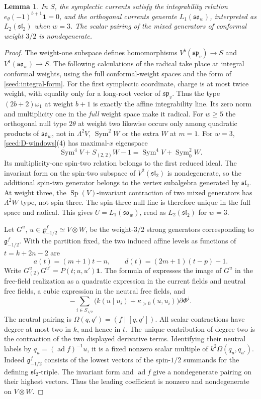 \documentclass[11pt,a4paper]{amsart}
\numberwithin{equation}{section}
\newtheorem{lemma}[theorem]{Lemma}
\theoremstyle{definition}
\theoremstyle{remark}
\newcommand{\g}{\mathfrak g}
\newcommand{\spg}{\mathfrak{sp}}
\newcommand{\sog}{\mathfrak{so}}
\newcommand{\slg}{\mathfrak{sl}}
\newcommand{\Sym}{\operatorname{Sym}}
\begin{document}
\begin{lemma}\label{seed:D-current-pairing}
In $S$, the symplectic currents satisfy the integrability relation
$e_\theta(-1)^{b+1}\mathbf1=0$, and the orthogonal currents generate
$L_1(\sog_w)$, interpreted as $L_2(\slg_2)$ when $w=3$.
The scalar pairing of the mixed generators of conformal weight $3/2$
is nondegenerate.
\end{lemma}
\begin{proof}
The weight-one subspace defines homomorphisms
$V^b(\spg_v)\to S$ and $V^1(\sog_w)\to S$.
The following calculations of the radical take place at integral conformal weights,
using the full conformal-weight spaces and the form of \cref{seed:integral-form}.
For the first symplectic coordinate, charge is at most twice weight,
with equality only for a long-root vector of $\spg_v$. Thus the type
$(2b+2)\omega_1$ at weight $b+1$ is exactly the affine integrability
line. Its zero norm and multiplicity one in the \emph{full} weight
space make it radical. For $w\ge5$ the orthogonal null type $2\theta$
at weight two likewise occurs only among quadratic products of $\sog_w$, not in
$\Lambda^2V$, $\Sym^2W$ or the extra $W$ at $m=1$.
For $w=3$, \cref{seed:D-windows}(4) has maximal-$x$ eigenspace
$$
 \Sym^4V+S_{(2,2)}W-1=\Sym^4V+\Sym^2_0W.
$$
Its multiplicity-one spin-two relation belongs to the first reduced ideal.
The invariant form on the spin-two subspace of $V^2(\slg_2)$ is
nondegenerate, so the additional spin-two generator belongs to
the vertex subalgebra generated by $\slg_2$. At weight three,
the $\operatorname{Sp}(V)$-invariant contraction of two mixed generators has
$\Lambda^2W$ type, not spin three. The spin-three null line is therefore
unique in the full space and radical. This gives
$U=L_1(\sog_w)$, read as $L_2(\slg_2)$ for $w=3$.

Let $G^u$, $u\in\g^f_{-1/2}\simeq V\otimes W$, be the weight-$3/2$
strong generators corresponding to $\g^f_{-1/2}$. With the partition fixed,
the two induced affine levels as functions of $t=k+2n-2$ are
$$
 a(t)=(m+1)t-n,\qquad d(t)=(2m+1)(t-p)+1.
$$
Write $G^u_{(2)}G^{u'}=P(t;u,u')\mathbf1$.
The formula of \cite[Corollary~3.1]{KacWakimoto2022} expresses the image
of $G^u$ in the free-field realization as a quadratic expression
in the current fields and neutral free fields, a cubic expression
in the neutral free fields,
and
$$
 -\sum_{i\in S_{1/2}}
 \bigl(k(u\mid u_i)+\kappa_{>0}(u,u_i)\bigr)\partial\Phi^i.
$$
The neutral pairing is $\Omega(q,q')=(f\mid[q,q'])$.
All scalar contractions have degree at most two in $k$, and hence in $t$. The unique contribution of degree two is the contraction
of the two displayed derivative terms. Identifying their neutral
labels by $q_u=(\operatorname{ad}f)^{-1}u$, it is a fixed nonzero
scalar multiple of $k^2\Omega(q_u,q_{u'})$.
Indeed $\g^f_{-1/2}$ consists of the lowest vectors of the
spin-$1/2$ summands for the defining $\mathfrak{sl}_2$-triple.
The invariant form and $\operatorname{ad}f$ give a nondegenerate
pairing on their highest vectors. Thus the leading coefficient
is nonzero and nondegenerate on $V\otimes W$.


\end{proof}
\end{document}
